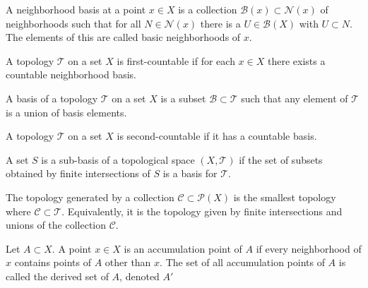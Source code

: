 \documentclass[12pt,letterpaper,reqno]{article}
\begin{document}
\begin{definition}\label{def:neighborhood-basis}
    A neighborhood basis at a point $x \in X$ is a collection $\mathcal{B}(x) \subset \mathcal{N}(x)$ of neighborhoods such that for all $N \in \mathcal{N}(x)$ there is a $U \in \mathcal{B}(X)$ with $U \subset N$. The elements of this are called basic neighborhoods of $x$.
\end{definition}

\begin{definition}\label{def:first-countable}
    A topology $\mathcal{T}$ on a set $X$ is first-countable if for each $x \in X$ there exists a countable neighborhood basis.
\end{definition}

\begin{definition}[Basis]\label{def:basis}
    A basis of a topology $\mathcal{T}$ on a set $X$ is a subset $\mathcal{B} \subset \mathcal{T}$ such that any element of $\mathcal{T}$ is a union of basis elements.
\end{definition}

\begin{definition}\label{def:second-countable}
    A topology $\mathcal{T}$ on a set $X$ is second-countable if it has a countable basis.
\end{definition}

\begin{definition}\label{def:sub-basis}
    A set $S$ is a sub-basis of a topological space $(X, \mathcal{T})$ if the set of subsets obtained by finite intersections of $S$ is a basis for $\mathcal{T}$. 
\end{definition}

\begin{definition}\label{def:topology-generated-by-a-set}
    The topology generated by a collection $\mathcal{C} \subset \mathcal{P}(X)$ is the smallest topology where $\mathcal{C} \subset \mathcal{T}$. Equivalently, it is the topology given by finite intersections and unions of the collection $\mathcal{C}$.
\end{definition}

\begin{definition}\label{def:accumulation-point}
    Let $A \subset X$. A point $x \in X$ is an accumulation point of $A$ if every neighborhood of $x$ contains points of $A$ other than $x$. The set of all accumulation points of $A$ is called the derived set of $A$, denoted $A'$
\end{definition}
\end{document}
